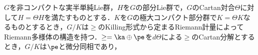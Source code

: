 $G$を非コンパクトな実半単純Lie群，$H$を$G$の部分Lie群で，$G$のCartan対合$\Theta$に対して$H = \Theta H$を満たすものとする．$K$を$G$の極大コンパクト部分群で$K = \Theta K $なるものとするとき，$G/K$は$\ge$のKilling形式から定まるRiemann計量によってRiemann多様体の構造を持つ．$\ge = \ka \oplus \pe $を$d\Theta$による$\ge$のCartan分解とするとき，$G/K$は$\pe$と微分同相であり，



